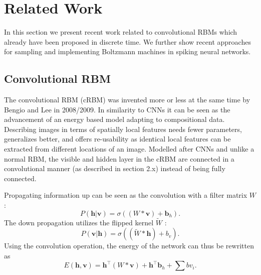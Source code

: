 \chapter{Related Work}

In this section we present recent work related to convolutional RBMs which already have been proposed in discrete time.
We further show recent approaches for sampling and implementing Boltzmann machines in spiking neural networks.

\section{Convolutional RBM}

The convolutional RBM (cRBM) was invented more or less at the same time by Bengio and Lee in 2008/2009. 
In similarity to CNNs it can be seen as the advancement of an energy based model adapting to compositional data.
Describing images in terms of spatially local features needs fewer parameters, generalizes better, and offers re-usability as identical local features can be extracted from different locations of an image.
Modelled after CNNs and unlike a normal RBM, the visible and hidden layer in the cRBM are connected in a convolutional manner (as described in section 2.x) instead of being fully connected.


Propagating information up can be seen as the convolution with a filter matrix $W$ : 
\[
P(\textbf{h} | \textbf{v}) = \sigma((W * \textbf{v}) + \textbf{b}_{h}).
\]
The down propagation utilizes the flipped kernel $\tilde{W}$ :
\[
P(\textbf{v}| \textbf{h}) = \sigma((\tilde{W} * \textbf{h}) + b_v).
\]
Using the convolution operation, the energy of the network can thus be rewritten as
\[
E(\textbf{h} , \textbf{v}) = \textbf{h}^\intercal(W * \textbf{v}) + \textbf{h}^\intercal \textbf{b}_{h} + \sum b v_i.
\]



